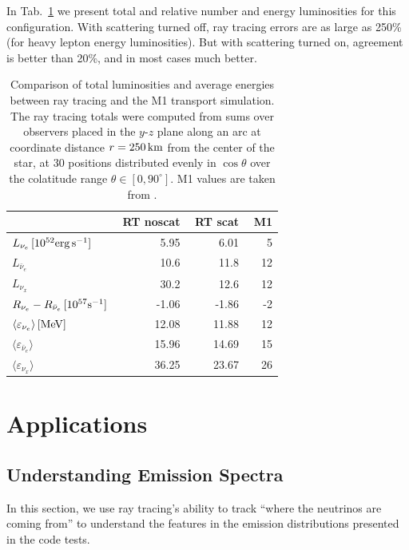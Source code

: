 \documentclass[aps,floatfix,prd,superscriptaddress,twocolumn]{revtex4-1}
\newcommand{\todo}[1]{\marginpar{\tiny{\textcolor{red}{#1}}}}
\begin{document}
In Tab.~\ref{tab:nsns_rt_vs_m1} we present total and relative number and
energy luminosities for this configuration.
With scattering turned off, ray tracing errors are as large as 250\%
(for heavy lepton energy luminosities).
But with scattering turned on, agreement is better than 20\%, and
in most cases much better.
\todo{get accurage M1 numbers from Francois}

\begin{table}%
  \caption{
    Comparison of total luminosities and average energies between
    ray tracing and the M1 transport simulation.
    The ray tracing totals were computed from sums over
    observers placed in the $y$-$z$ plane along an arc at coordinate distance
    $r=250\,{\rm km}$ from the center of the star, at 30 positions
    distributed evenly in $\cos\theta$ over the colatitude range
    $\theta\in[0,90^{\circ}]$.
    M1 values are taken from \cite[Figs. 7, 9, 10]{fouc2016-m1_evolve_n}.
  }
  \label{tab:nsns_rt_vs_m1}
  \begin{tabularx}{\columnwidth}{X r r r}
    & \,\,{\bf RT noscat} & \,\,{\bf RT scat} & \,\,{\bf M1} \\
    \hline
    $L_{\nu_e}\,[10^{52}{\rm erg}\,{\rm s}^{-1}]$        & 5.95 & 6.01 & 5 \\
    $L_{\bar{\nu}_e}$                                    & 10.6 & 11.8 & 12 \\
    $L_{\nu_x}$                                          & 30.2 & 12.6 & 12 \\
    \hline
    $R_{\nu_e}-R_{\bar{\nu}_e}\,[10^{57}{\rm s}^{-1}]$   & -1.06 & -1.86 & -2 \\
    \hline
    $\langle \varepsilon_{\nu_e} \rangle\,[{\rm MeV}]$   & 12.08 & 11.88 & 12 \\
    $\langle \varepsilon_{\bar{\nu}_e} \rangle$          & 15.96 & 14.69 & 15 \\
    $\langle \varepsilon_{\nu_x} \rangle$                & 36.25 & 23.67 & 26 \\
    \hline
  \end{tabularx}
\end{table}

\section{Applications}
\label{sec:applications}

\subsection{Understanding Emission Spectra}
\label{ssec:spectra}
In this section, we use ray tracing's ability to track ``where the neutrinos
are coming from'' to understand the features in the emission distributions
presented in the code tests.
\end{document}
